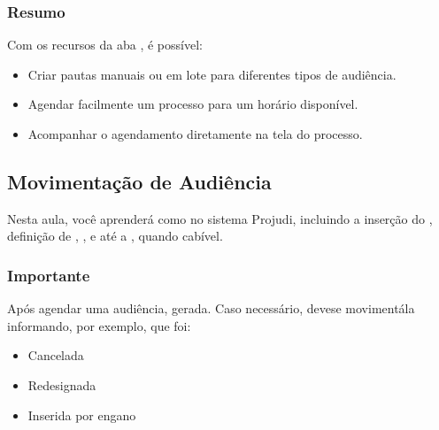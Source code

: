 \documentclass[letterpaper,10pt,brazil]{sphinxmanual}
\begin{document}
\subsubsection{Resumo}
\label{\detokenize{projud_46_comopautaraudiencia:resumo}}
\sphinxAtStartPar
Com os recursos da aba , é possível:
\begin{itemize}
\item {} 
\sphinxAtStartPar
Criar pautas manuais ou em lote para diferentes tipos de audiência.

\item {} 
\sphinxAtStartPar
Agendar facilmente um processo para um horário disponível.

\item {} 
\sphinxAtStartPar
Acompanhar o agendamento diretamente na tela do processo.

\end{itemize}

\sphinxstepscope


\subsection{Movimentação de Audiência}
\label{\detokenize{projud_47_movimentacaoaudiencia:movimentacao-de-audiencia}}\label{\detokenize{projud_47_movimentacaoaudiencia::doc}}
\sphinxAtStartPar
Nesta aula, você aprenderá como  no sistema Projudi, incluindo a inserção do , definição de , , e até a , quando cabível.


\subsubsection{Importante}
\label{\detokenize{projud_47_movimentacaoaudiencia:importante}}
\sphinxAtStartPar
Após agendar uma audiência,  gerada. Caso necessário, deve\sphinxhyphen{}se movimentá\sphinxhyphen{}la informando, por exemplo, que foi:
\begin{itemize}
\item {} 
\sphinxAtStartPar
Cancelada

\item {} 
\sphinxAtStartPar
Redesignada

\item {} 
\sphinxAtStartPar
Inserida por engano

\end{itemize}
\end{document}
